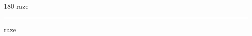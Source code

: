 
\begin{frame}
\begin{center}
\begin{turn}{180}
{\fontsize{2.5cm}{1em}\selectfont raze}
\end{turn}
\vspace{1em}\par  
\hrule
\vspace{1em}\par  
{\fontsize{2.5cm}{1em}\selectfont raze}
\end{center}
\end{frame}
